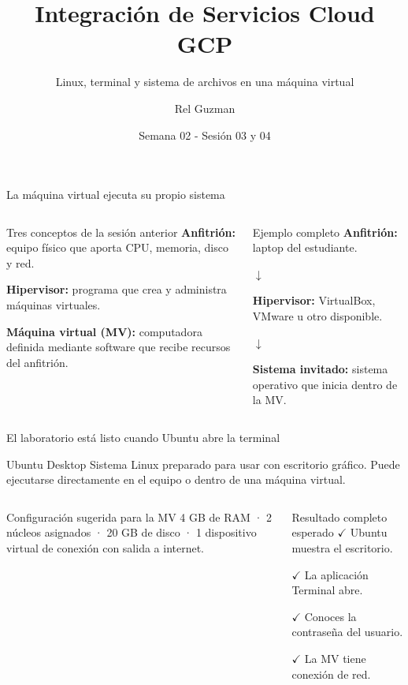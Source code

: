 \documentclass[aspectratio=169,10pt,c]{beamer}
\title{Integración de Servicios Cloud GCP}
\subtitle{Linux, terminal y sistema de archivos en una máquina virtual}
\date{Semana 02 - Sesión 03 y 04}
\author{Rel Guzman}
\begin{document}
{\maketitle}

\begin{frame}{La máquina virtual ejecuta su propio sistema}
\begin{columns}[T,onlytextwidth]
\begin{block}{Tres conceptos de la sesión anterior}
\small
\textbf{Anfitrión:} equipo físico que aporta CPU, memoria, disco y red.\par\medskip
\textbf{Hipervisor:} programa que crea y administra máquinas virtuales.\par\medskip
\textbf{Máquina virtual (MV):} computadora definida mediante software que recibe recursos del anfitrión.
\end{block}
\begin{exampleblock}{Ejemplo completo}
\small
\textbf{Anfitrión:} laptop del estudiante.\par
$\downarrow$\par
\textbf{Hipervisor:} VirtualBox, VMware u otro disponible.\par
$\downarrow$\par
\textbf{Sistema invitado:} sistema operativo que inicia dentro de la MV.
\end{exampleblock}
\end{columns}
\end{frame}

\begin{frame}{El laboratorio está listo cuando Ubuntu abre la terminal}
\begin{alertblock}{Ubuntu Desktop}
\small Sistema Linux preparado para usar con escritorio gráfico. Puede ejecutarse directamente en el equipo o dentro de una máquina virtual.
\end{alertblock}
\begin{columns}[T,onlytextwidth]
\begin{block}{Configuración sugerida para la MV}
\small 4 GB de RAM · 2 núcleos asignados · 20 GB de disco · 1 dispositivo virtual de conexión con salida a internet.
\end{block}
\begin{exampleblock}{Resultado completo esperado}
\small
$\checkmark$ Ubuntu muestra el escritorio.\par
$\checkmark$ La aplicación Terminal abre.\par
$\checkmark$ Conoces la contraseña del usuario.\par
$\checkmark$ La MV tiene conexión de red.
\end{exampleblock}
\end{columns}
\end{frame}
\end{document}
